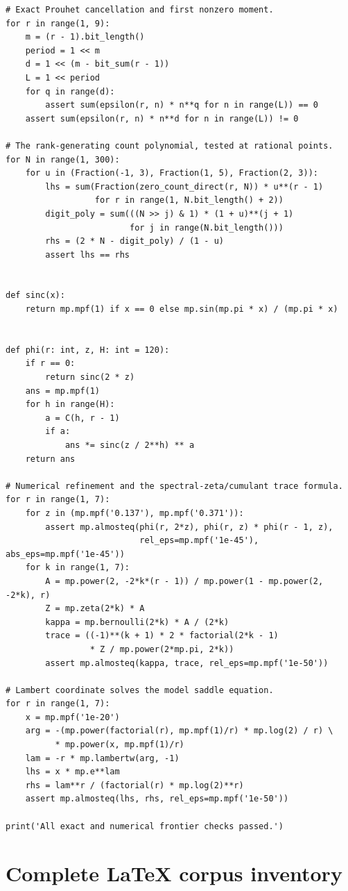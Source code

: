 \documentclass[11pt,oneside]{article}
\theoremstyle{definition}
\theoremstyle{remark}
\begin{document}
\begin{lstlisting}[style=frontiercode,caption={Exact and high-precision verification script.},label={lst:verification}]
# Exact Prouhet cancellation and first nonzero moment.
for r in range(1, 9):
    m = (r - 1).bit_length()
    period = 1 << m
    d = 1 << (m - bit_sum(r - 1))
    L = 1 << period
    for q in range(d):
        assert sum(epsilon(r, n) * n**q for n in range(L)) == 0
    assert sum(epsilon(r, n) * n**d for n in range(L)) != 0

# The rank-generating count polynomial, tested at rational points.
for N in range(1, 300):
    for u in (Fraction(-1, 3), Fraction(1, 5), Fraction(2, 3)):
        lhs = sum(Fraction(zero_count_direct(r, N)) * u**(r - 1)
                  for r in range(1, N.bit_length() + 2))
        digit_poly = sum(((N >> j) & 1) * (1 + u)**(j + 1)
                         for j in range(N.bit_length()))
        rhs = (2 * N - digit_poly) / (1 - u)
        assert lhs == rhs


def sinc(x):
    return mp.mpf(1) if x == 0 else mp.sin(mp.pi * x) / (mp.pi * x)


def phi(r: int, z, H: int = 120):
    if r == 0:
        return sinc(2 * z)
    ans = mp.mpf(1)
    for h in range(H):
        a = C(h, r - 1)
        if a:
            ans *= sinc(z / 2**h) ** a
    return ans

# Numerical refinement and the spectral-zeta/cumulant trace formula.
for r in range(1, 7):
    for z in (mp.mpf('0.137'), mp.mpf('0.371')):
        assert mp.almosteq(phi(r, 2*z), phi(r, z) * phi(r - 1, z),
                           rel_eps=mp.mpf('1e-45'), abs_eps=mp.mpf('1e-45'))
    for k in range(1, 7):
        A = mp.power(2, -2*k*(r - 1)) / mp.power(1 - mp.power(2, -2*k), r)
        Z = mp.zeta(2*k) * A
        kappa = mp.bernoulli(2*k) * A / (2*k)
        trace = ((-1)**(k + 1) * 2 * factorial(2*k - 1)
                 * Z / mp.power(2*mp.pi, 2*k))
        assert mp.almosteq(kappa, trace, rel_eps=mp.mpf('1e-50'))

# Lambert coordinate solves the model saddle equation.
for r in range(1, 7):
    x = mp.mpf('1e-20')
    arg = -(mp.power(factorial(r), mp.mpf(1)/r) * mp.log(2) / r) \
          * mp.power(x, mp.mpf(1)/r)
    lam = -r * mp.lambertw(arg, -1)
    lhs = x * mp.e**lam
    rhs = lam**r / (factorial(r) * mp.log(2)**r)
    assert mp.almosteq(lhs, rhs, rel_eps=mp.mpf('1e-50'))

print('All exact and numerical frontier checks passed.')
\end{lstlisting}

\section{Complete LaTeX corpus inventory}\label{p3:app:corpus}
\end{document}
